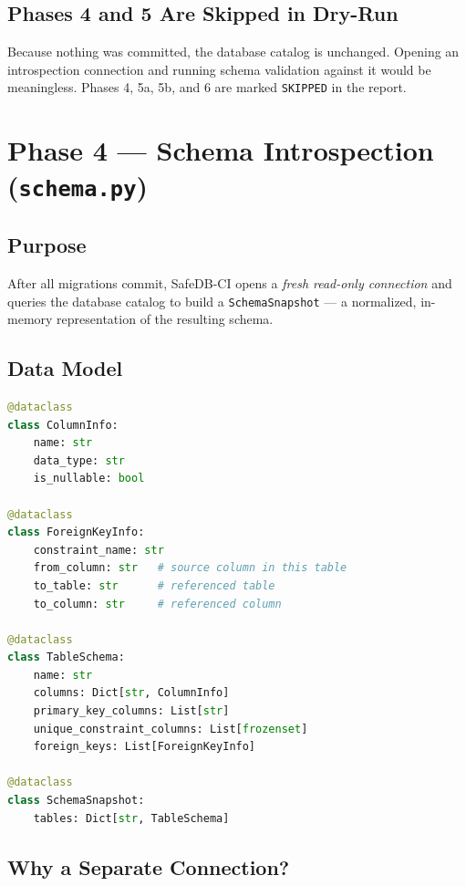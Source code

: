 \documentclass[12pt,a4paper]{report}
\begin{document}
\subsection{Phases 4 and 5 Are Skipped in Dry-Run}

Because nothing was committed, the database catalog is unchanged. Opening an
introspection connection and running schema validation against it would be
meaningless. Phases 4, 5a, 5b, and 6 are marked \texttt{SKIPPED} in the report.

\section{Phase 4 — Schema Introspection (\texttt{schema.py})}

\subsection{Purpose}

After all migrations commit, SafeDB-CI opens a \emph{fresh read-only connection}
and queries the database catalog to build a \texttt{SchemaSnapshot} — a
normalized, in-memory representation of the resulting schema.

\subsection{Data Model}

\begin{lstlisting}[language=python, caption={SchemaSnapshot data model}]
@dataclass
class ColumnInfo:
    name: str
    data_type: str
    is_nullable: bool

@dataclass
class ForeignKeyInfo:
    constraint_name: str
    from_column: str   # source column in this table
    to_table: str      # referenced table
    to_column: str     # referenced column

@dataclass
class TableSchema:
    name: str
    columns: Dict[str, ColumnInfo]
    primary_key_columns: List[str]
    unique_constraint_columns: List[frozenset]
    foreign_keys: List[ForeignKeyInfo]

@dataclass
class SchemaSnapshot:
    tables: Dict[str, TableSchema]
\end{lstlisting}

\subsection{Why a Separate Connection?}
\end{document}
